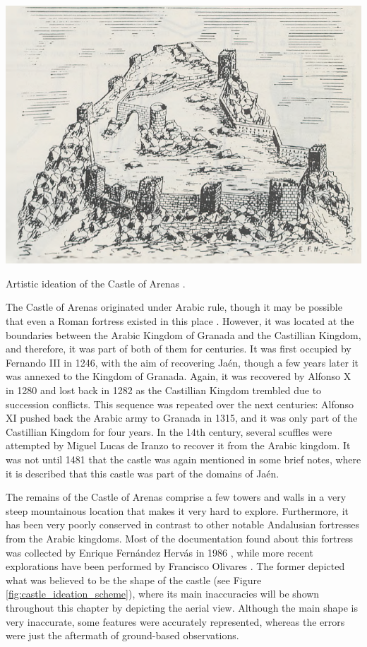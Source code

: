 \begin{marginfigure}[0.2cm]
    \centering
    \includegraphics[width=\linewidth]{figs/castle_puerta_arenas/castle_ideation.PNG}
    \caption{Artistic ideation of the Castle of Arenas \cite{fernandez_hervas_castillo_1986}.}
    \label{fig:castle_ideation_art}
\end{marginfigure}
The Castle of Arenas originated under Arabic rule, though it may be possible that even a Roman fortress existed in this place \cite{fernandez_hervas_castillo_1986}. However, it was located at the boundaries between the Arabic Kingdom of Granada and the Castillian Kingdom, and therefore, it was part of both of them for centuries. It was first occupied by Fernando III in 1246, with the aim of recovering Jaén, though a few years later it was annexed to the Kingdom of Granada. Again, it was recovered by Alfonso X in 1280 and lost back in 1282 as the Castillian Kingdom trembled due to succession conflicts. This sequence was repeated over the next centuries: Alfonso XI pushed back the Arabic army to Granada in 1315, and it was only part of the Castillian Kingdom for four years. In the 14th century, several scuffles were attempted by Miguel Lucas de Iranzo to recover it from the Arabic kingdom. It was not until 1481 that the castle was again mentioned in some brief notes, where it is described that this castle was part of the domains of Jaén.

The remains of the Castle of Arenas comprise a few towers and walls in a very steep mountainous location that makes it very hard to explore. Furthermore, it has been very poorly conserved in contrast to other notable Andalusian fortresses from the Arabic kingdoms. Most of the documentation found about this fortress was collected by Enrique Fernández Hervás in 1986 \cite{fernandez_hervas_castillo_1986}, while more recent explorations have been performed by Francisco Olivares \cite{olivares_castillos_1992}. The former depicted what was believed to be the shape of the castle (see Figure \ref{fig:castle_ideation_scheme}), where its main inaccuracies will be shown throughout this chapter by depicting the aerial view. Although the main shape is very inaccurate, some features were accurately represented, whereas the errors were just the aftermath of ground-based observations.

